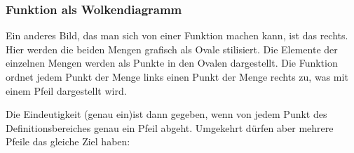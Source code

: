 \subsubsection{Funktion als Wolkendiagramm}
\begin{minipage}{0.6\textwidth}
    Ein anderes Bild, das man sich von einer Funktion machen kann, ist das rechts. Hier werden die beiden Mengen grafisch als Ovale stilisiert. Die Elemente der einzelnen Mengen werden als Punkte in den Ovalen dargestellt. Die Funktion ordnet jedem Punkt der Menge links einen Punkt der Menge rechts zu, was mit einem Pfeil dargestellt wird.
\end{minipage}
\begin{minipage}{0.4\textwidth}
\end{minipage}
Die Eindeutigkeit (\glqq genau ein\grqq{})ist dann gegeben, wenn von jedem Punkt des Definitionsbereiches genau ein Pfeil abgeht. Umgekehrt dürfen aber mehrere Pfeile das gleiche Ziel haben:
